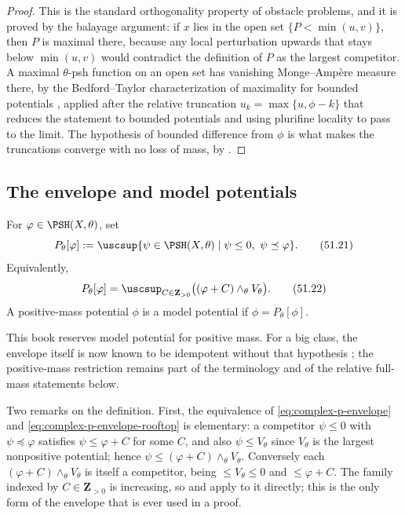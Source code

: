 \begin{proof}
This is the standard orthogonality property of obstacle problems, and it
is proved by the balayage argument: if \(x\) lies in the open set
\(\{P<\min(u,v)\}\), then \(P\) is maximal there, because any local
perturbation upwards that stays below \(\min(u,v)\) would contradict the
definition of \(P\) as the largest competitor.  A maximal
\(\theta\)-psh function on an open set has vanishing Monge--Amp\`ere
measure there, by the Bedford--Taylor characterization of maximality for
bounded potentials \cite{BT82}, applied after the relative truncation
\(u_k=\max\{u,\phi-k\}\) that reduces the statement to bounded
potentials and using plurifine locality to pass to the limit.  The
hypothesis of bounded difference from \(\phi\) is what makes the
truncations converge with no loss of mass, by
.
\end{proof}

\subsection{The envelope and model potentials}
\label{sec:ch51-p-envelope-def}

\begin{definition}
\label{def:complex-p-envelope}
For \(\varphi\in\PSH(X,\theta)\), set
\[
 P_\theta[\varphi]
 :=\uscsup\{\psi\in\PSH(X,\theta)\mid
              \psi\leq0,\ \psi\preceq\varphi\}.
\tag{51.21}\label{eq:complex-p-envelope}
\]
Equivalently,
\[
 P_\theta[\varphi]
 =\uscsup_{C\in\mathbf Z_{>0}}
       \bigl((\varphi+C)\wedge_\theta V_\theta\bigr).
\tag{51.22}\label{eq:complex-p-envelope-rooftop}
\]
A positive-mass potential \(\phi\) is a model potential if
\(\phi=P_\theta[\phi]\).
\end{definition}

This book reserves model potential for positive mass.  For a big class,
the envelope itself is now known to be idempotent without that hypothesis
\cite[Theorem~1.2]{PSWZ26}; the positive-mass restriction remains part of
the terminology and of the relative full-mass statements below.

Two remarks on the definition.  First, the equivalence of
\eqref{eq:complex-p-envelope} and
\eqref{eq:complex-p-envelope-rooftop} is elementary: a competitor
\(\psi\leq0\) with \(\psi\preceq\varphi\) satisfies \(\psi\leq\varphi+C\)
for some \(C\), and also \(\psi\leq V_\theta\) since
\(V_\theta\) is the largest nonpositive potential; hence
\(\psi\leq(\varphi+C)\wedge_\theta V_\theta\).  Conversely each
\((\varphi+C)\wedge_\theta V_\theta\) is itself a competitor, being
\(\leq V_\theta\leq0\) and \(\leq\varphi+C\).  The family indexed by
\(C\in\mathbf Z_{>0}\) is increasing, so
 and
 apply to it directly; this is the only
form of the envelope that is ever used in a proof.

